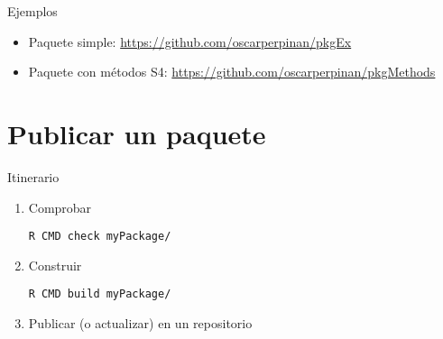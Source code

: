\documentclass[xcolor={usenames,svgnames,dvipsnames}]{beamer}
\begin{document}
\begin{frame}[label={sec:org47950d5}]{Ejemplos}
\begin{itemize}
\item Paquete simple: \url{https://github.com/oscarperpinan/pkgEx}
\item Paquete con métodos S4: \url{https://github.com/oscarperpinan/pkgMethods}
\end{itemize}
\end{frame}

\section{Publicar un paquete}
\label{sec:orgf2be190}

\begin{frame}[label={sec:org8dfbd6a},fragile]{Itinerario}
 \begin{enumerate}
\item Comprobar
\lstset{language=sh,label= ,caption= ,captionpos=b,numbers=none}
\begin{lstlisting}
R CMD check myPackage/
\end{lstlisting}
\item Construir
\lstset{language=sh,label= ,caption= ,captionpos=b,numbers=none}
\begin{lstlisting}
R CMD build myPackage/
\end{lstlisting}
\item Publicar (o actualizar) en un repositorio
\end{enumerate}
\end{frame}
\end{document}
